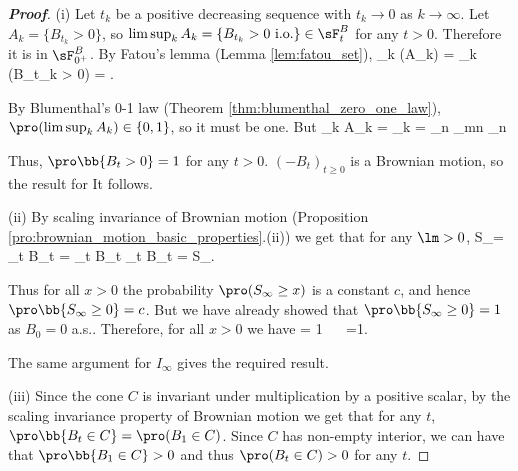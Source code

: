 \begin{proof}[\bf Proof]
\ben
\item [(i)] Let $t_k$ be a positive decreasing sequence with $t_k \to 0$ as $k \to\infty$. Let $A_k = \{B_{t_k} > 0\}$, so $\limsup_{k} A_k = \{B_{t_k} > 0 \text{ i.o.}\}\in \sF^B_t$ for any $t > 0$. Therefore it is in $\sF^B_{0^+}$. By Fatou's lemma (Lemma \ref{lem:fatou_set}),
\be
\pro{} \geq \limsup_k \pro(A_k) = \limsup_k \pro(B_{t_k} > 0) = .
\ee

By Blumenthal's 0-1 law (Theorem \ref{thm:blumenthal_zero_one_law}), $\pro(\limsup_k A_k) \in \{0, 1\}$, so it must be one. But
\be
\limsup_k A_k = \limsup_k  = \bigcap_n \bigcup_{m\geq n} \subseteq \bigcap_n  %
\ee

Thus, $\pro\bb{B_t > 0} = 1$ for any $t >0$. %
$(-B_t)_{t \geq 0}$ is a Brownian motion, so the result for It follows.

\item [(ii)] By scaling invariance of Brownian motion (Proposition \ref{pro:brownian_motion_basic_properties}.(ii)) we get that for any $\lm > 0$,
\be
S_\infty = \sup_{t} B_t = \sup_{t} B_{\lm t}  \sup_{t} \sqrt{\lm }B_t = \sqrt{\lm} S_\infty.
\ee


Thus for all $x>0$ the probability $\pro(S_\infty \geq x)$ is a constant $c$, and hence $\pro\bb{S_\infty \geq 0} =c$. But we have already showed that $\pro\bb{S_\infty \geq 0} = 1$ as $B_0 = 0$ a.s.. Therefore, for all $x >0$ we have
\be
\pro{} = 1 \ \ra \ \pro{} =1.
\ee

The same argument for $I_\infty$ gives the required result.


\item [(iii)] Since the cone $C$ is invariant under multiplication by a positive scalar, by the scaling invariance property of Brownian motion we get that for any $t$, $\pro\bb{B_t\in C} = \pro(B_1\in C)$. Since $C$ has non-empty interior, we can have that $\pro\bb{B_1\in C} >0$ and thus $\pro(B_t \in C) >0$ for any $t$.


\end{proof}
